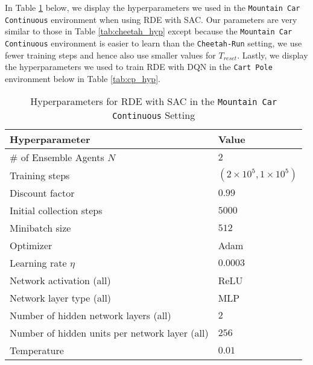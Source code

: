 \documentclass[base]{subfiles}
\begin{document}
In Table \ref{tab:mc_hyp} below, we display the hyperparameters we used in the \texttt{Mountain Car Continuous} environment when using RDE with SAC.
Our parameters are very similar to those in Table \ref{tab:cheetah_hyp} except because the \texttt{Mountain Car Continuous} environment is easier to learn than the \texttt{Cheetah-Run} setting, we use fewer training steps and hence also use smaller values for $T_{reset}$.
Lastly, we display the hyperparameters we used to train RDE with DQN in the \texttt{Cart Pole} environment below in Table \ref{tab:cp_hyp}.

\begin{table}[h]
	\caption{Hyperparameters for RDE with SAC in the \texttt{Mountain Car Continuous} Setting}
	\label{tab:mc_hyp}
	\centering
	\begin{tabular}{l|l}
		\toprule
		Hyperparameter                                 & Value                                           \\
		\hline
		\# of Ensemble Agents $N$                      & $2$                                             \\
		Training steps                                 & $(2 \times 10^5, 1 \times 10^5)$                \\
		Discount factor                                & $0.99$                                          \\
		Initial collection steps                       & $5000$                                          \\
		Minibatch size                                 & $512$                                           \\
		Optimizer                                      & Adam                                            \\
		Learning rate $\eta$                           & $0.0003$                                        \\
		Network activation (all)                       & ReLU                                            \\
		Network layer type (all)                       & MLP                                             \\
		Number of hidden network layers (all)          & $2$                                             \\
		Number of hidden units per network layer (all) & $256$                                           \\
		Temperature                                    & $0.01$                                          \\

\end{tabular}
\end{table}
\end{document}
